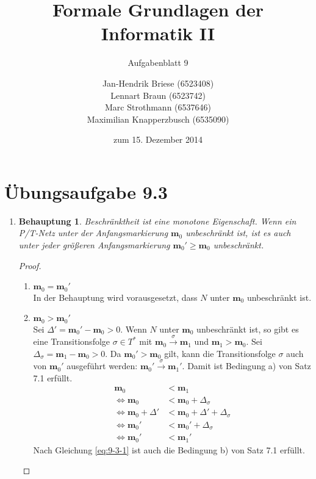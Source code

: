 \documentclass[a4paper]{scrartcl}
\title{Formale Grundlagen der Informatik II}
\subtitle{Aufgabenblatt 9}
\author{
    Jan-Hendrik Briese (6523408) \\
    Lennart Braun (6523742) \\
    Marc Strothmann (6537646) \\
    Maximilian Knapperzbusch (6535090)
}
\date{zum 15. Dezember 2014}
\newtheorem*{behaupt}{Behauptung}
\newcommand{\gdw}{\Leftrightarrow}
\begin{document}
\maketitle

\section*{Übungsaufgabe 9.3} 
\begin{enumerate}
    \item
        \begin{behaupt}
            Beschränktheit ist eine monotone Eigenschaft.
            Wenn ein P/T-Netz unter der Anfangsmarkierung $\textbf{m}_0$
            unbeschränkt ist, ist es auch unter jeder größeren Anfangsmarkierung
            $\textbf{m}_0' \geq \textbf{m}_0$ unbeschränkt.
        \end{behaupt}
        \begin{proof} \hfill \\
            \begin{enumerate}
                \item $\textbf{m}_0 = \textbf{m}_0'$ \\
                    In der Behauptung wird vorausgesetzt, dass $N$ unter
                    $\textbf{m}_0$ unbeschränkt ist. 

                \item $\textbf{m}_0 > \textbf{m}_0'$ \\
                    Sei $\Delta' = \textbf{m}_0' - \textbf{m}_0 > 0$.
                    Wenn $N$ unter $\textbf{m}_0$ unbeschränkt ist, so gibt es
                    eine Transitionsfolge $\sigma \in T^*$ mit
                    $\textbf{m}_0 \stackrel{\sigma}{\to} \textbf{m}_1$ und
                    $\textbf{m}_1 > \textbf{m}_0$.
                    Sei $\Delta_\sigma = \textbf{m}_1 - \textbf{m}_0 > 0$.
                    Da $\textbf{m}_0' > \textbf{m}_0$ gilt, kann die
                    Transitionsfolge $\sigma$ auch von $\textbf{m}_0'$
                    ausgeführt werden:
                    $\textbf{m}_0' \stackrel{\sigma}{\to} \textbf{m}_1'$.
                    Damit ist Bedingung a) von Satz 7.1 erfüllt.
                    \begin{equation}
                        \begin{split}
                            \textbf{m}_0 &< \textbf{m}_1 \\
                            \gdw \textbf{m}_0 &< \textbf{m}_0 + \Delta_\sigma \\
                            \gdw \textbf{m}_0 + \Delta' &< \textbf{m}_0 + \Delta' + \Delta_\sigma \\
                            \gdw \textbf{m}_0' &< \textbf{m}_0' + \Delta_\sigma \\
                            \gdw \textbf{m}_0' &< \textbf{m}_1'
                        \end{split}
                        \label{eq:9-3-1}
                    \end{equation}
                    Nach Gleichung \ref{eq:9-3-1} ist auch die Bedingung b) von
                    Satz 7.1 erfüllt.
                    

\end{enumerate}
\end{proof}
\end{enumerate}
\end{document}
